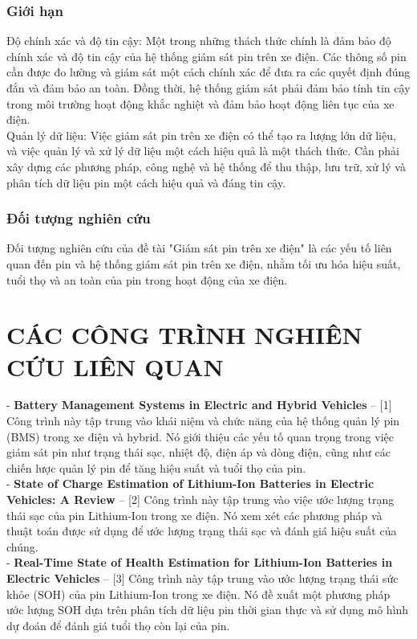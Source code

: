 \documentclass[a4paper,11pt]{article}
\theoremstyle{mytheor}
\begin{document}
\subsubsection{Giới hạn}
Độ chính xác và độ tin cậy: Một trong những thách thức chính là đảm bảo độ chính xác và độ tin cậy của hệ thống giám sát pin trên xe điện. Các thông số pin cần được đo lường và giám sát một cách chính xác để đưa ra các quyết định đúng đắn và đảm bảo an toàn. Đồng thời, hệ thống giám sát phải đảm bảo tính tin cậy trong môi trường hoạt động khắc nghiệt và đảm bảo hoạt động liên tục của xe điện.\\
Quản lý dữ liệu: Việc giám sát pin trên xe điện có thể tạo ra lượng lớn dữ liệu, và việc quản lý và xử lý dữ liệu một cách hiệu quả là một thách thức. Cần phải xây dựng các phương pháp, công nghệ và hệ thống để thu thập, lưu trữ, xử lý và phân tích dữ liệu pin một cách hiệu quả và đáng tin cậy.
\subsubsection{Đối tượng nghiên cứu }
Đối tượng nghiên cứu của đề tài "Giám sát pin trên xe điện" là các yếu tố liên quan đến pin và hệ thống giám sát pin trên xe điện, nhằm tối ưu hóa hiệu suất, tuổi thọ và an toàn của pin trong hoạt động của xe điện.

\section{CÁC CÔNG TRÌNH NGHIÊN CỨU LIÊN QUAN }
- \textbf{Battery Management Systems in Electric and Hybrid Vehicles} – [1] Công trình này tập trung vào khái niệm và chức năng của hệ thống quản lý pin (BMS) trong xe điện và hybrid. Nó giới thiệu các yếu tố quan trọng trong việc giám sát pin như trạng thái sạc, nhiệt độ, điện áp và dòng điện, cũng như các chiến lược quản lý pin để tăng hiệu suất và tuổi thọ của pin.\\

- \textbf{State of Charge Estimation of Lithium-Ion Batteries in Electric Vehicles: A Review} – [2] Công trình này tập trung vào việc ước lượng trạng thái sạc của pin Lithium-Ion trong xe điện. Nó xem xét các phương pháp và thuật toán được sử dụng để ước lượng trạng thái sạc và đánh giá hiệu suất của chúng.\\

- \textbf{Real-Time State of Health Estimation for Lithium-Ion Batteries in Electric Vehicles} – [3] Công trình này tập trung vào ước lượng trạng thái sức khỏe (SOH) của pin Lithium-Ion trong xe điện. Nó đề xuất một phương pháp ước lượng SOH dựa trên phân tích dữ liệu pin thời gian thực và sử dụng mô hình dự đoán để đánh giá tuổi thọ còn lại của pin.\\
\end{document}
